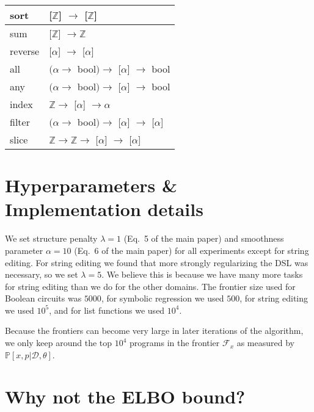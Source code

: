 \documentclass{article}
\newcommand{\probability}{\mathds{P}} %
\begin{document}
\begin{center}
\begin{tabular}{| l | l |}
    sort & [$\mathbb{Z}$] $\to$ [$\mathbb{Z}$] \\
    \hline
    sum & [$\mathbb{Z}$] $\to \mathbb{Z}$ \\
    reverse & [$\alpha$] $\to$ [$\alpha$] \\
    all & $(\alpha \to$ bool$) \to$ [$\alpha$] $\to$ bool \\
    any & $(\alpha \to$ bool$) \to$ [$\alpha$] $\to$ bool \\
    index & $\mathbb{Z} \to$ [$\alpha$] $\to \alpha$ \\
    filter & $(\alpha \to$ bool$) \to$ [$\alpha$] $\to$ [$\alpha$] \\
    slice & $\mathbb{Z} \to \mathbb{Z} \to$ [$\alpha$] $\to$ [$\alpha$] \\
  \hline
\end{tabular}
\end{center}

\vfill

\section{Hyperparameters \& Implementation details}
We set structure penalty $\lambda = 1$ (Eq.~5 of the main paper) and
smoothness parameter $\alpha = 10$ (Eq.~6 of the main paper)
for all experiments except for string editing.
For string editing we found that more strongly regularizing
the DSL was necessary,
so we set $\lambda = 5$.
We believe this is because
we have many more tasks for string editing than we do for the other domains.
The frontier size used for Boolean circuits was $5000$,
for symbolic regression we used $500$,
for string editing we used $10^5$,
and for list functions we used $10^4$.



Because the frontiers can become very large in later iterations of the algorithm,
we only keep around the top $10^4$ programs in the frontier $\mathcal{F}_x$ as measured by $\probability[x,p|\mathcal{D},\theta]$.




\section{Why not the ELBO bound?}
\end{document}
